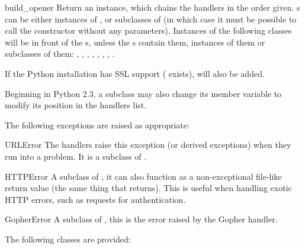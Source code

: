 \begin{funcdesc}{build_opener}{}
Return an  instance, which chains the
handlers in the order given. s can be either instances
of , or subclasses of  (in
which case it must be possible to call the constructor without
any parameters).  Instances of the following classes will be in
front of the s, unless the s contain
them, instances of them or subclasses of them:
, , ,
, ,
, , .

If the Python installation has SSL support (
exists),  will also be added.

Beginning in Python 2.3, a  subclass may also
change its  member variable to modify its
position in the handlers list.
\end{funcdesc}


The following exceptions are raised as appropriate:

\begin{excdesc}{URLError}
The handlers raise this exception (or derived exceptions) when they
run into a problem.  It is a subclass of .
\end{excdesc}

\begin{excdesc}{HTTPError}
A subclass of , it can also function as a 
non-exceptional file-like return value (the same thing that
 returns).  This is useful when handling exotic
HTTP errors, such as requests for authentication.
\end{excdesc}

\begin{excdesc}{GopherError}
A subclass of , this is the error raised by the
Gopher handler.
\end{excdesc}


The following classes are provided:


